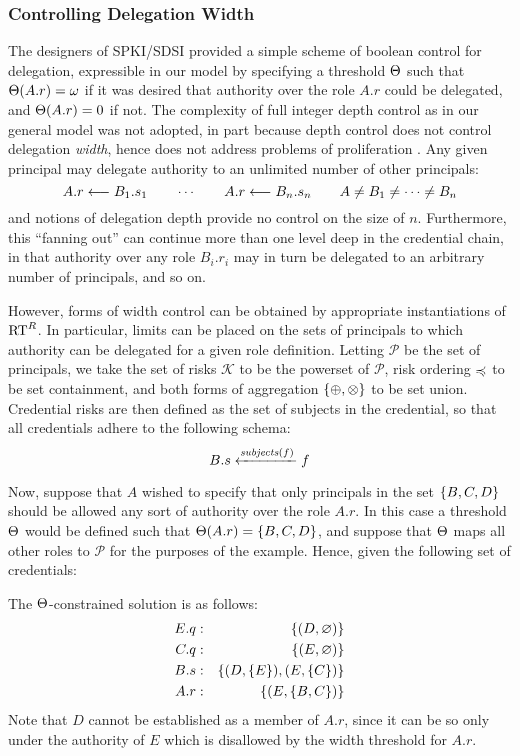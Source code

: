 \subsubsection{Controlling Delegation Width} 

The designers of SPKI/SDSI provided a simple scheme of boolean control
for delegation, expressible in our model by specifying a threshold
$\thresh$ such that $\thresh(A.r) = \omega$ if it was desired that
authority over the role $A.r$ could be delegated, and $\thresh(A.r) =
0$ if not.  The complexity of full integer depth control as in our
general model was not adopted, in part because depth control does not
control delegation \emph{width}, hence does not address problems of
proliferation \cite{ellison-etal-rfc99}.  Any given principal may
delegate authority to an unlimited number of other principals:
$$
\cred{A.r}{B_1.s_1}{} \qquad \cdots \qquad \cred{A.r}{B_n.s_n}{}
\qquad A \ne B_1 \ne \cdots \ne B_n
$$ and notions of delegation depth provide no control on the size of
$n$.  Furthermore, this ``fanning out'' can continue more than one
level deep in the credential chain, in that authority over any role
$B_i.r_i$ may in turn be delegated to an arbitrary number of
principals, and so on.

However, forms of width control can be obtained by appropriate
instantiations of $\RTR$.  In particular, limits can be placed on the
sets of principals to which authority can be delegated for a given
role definition.  Letting $\mathcal{P}$ be the set of principals, we
take the set of risks $\mathcal{K}$ to be the powerset of
$\mathcal{P}$, risk ordering $\po$ to be set containment, and both
forms of aggregation $\setdefn{\riskplus, \isectplus}$ to be set
union.  Credential risks are then defined as the set of subjects in
the credential, so that all credentials adhere to the following
schema:
$$
B.s \xleftarrow{\subjects(f)} f
$$

Now, suppose that $A$ wished to specify that only principals in the
set $\setdefn{B,C,D}$ should be allowed any sort of authority over the
role $A.r$.  In this case a threshold $\thresh$ would be defined such
that $\thresh(A.r) = \setdefn{B,C,D}$, and suppose that $\thresh$ maps
all other roles to $\mathcal{P}$ for the purposes of the example.
Hence, given the following set of credentials:
\begin{mathpar}




\end{mathpar}
The $\thresh$-constrained solution is as follows:
\begin{eqnarray*}
E.q &:& \setdefn{(D,\varnothing)}\\
C.q &:& \setdefn{(E,\varnothing)}\\
B.s &:& \setdefn{(D,\setdefn{E}),(E,\setdefn{C})}\\
A.r &:& \setdefn{(E,\setdefn{B,C})}
\end{eqnarray*}
Note that $D$ cannot be established as a member of $A.r$, since it can
be so only under the authority of $E$ which is disallowed by the
width threshold for $A.r$.
